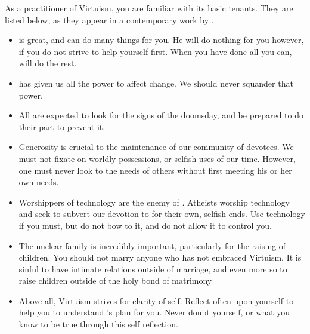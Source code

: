 \documentclass[blue]{guildcamp1}
\begin{document}
\name{\bVirtuism{}}

As a practitioner of Virtuism, you are familiar with its basic tenants. They are listed below, as they appear in a contemporary work by \cPastor{\MYname{}}.

\begin{itemize}
  \item \cGod{\MYname{}} is great, and can do many things for you. He will do nothing for you however, if you do not strive to help yourself first. When you have done all you can, \cGod{\MYname{}} will do the rest.
  
  \item \cGod{\MYname{}} has given us all the power to affect change. We should never squander that power. 
  
  \item All are expected to look for the signs of the doomsday, and be prepared to do their part to prevent it. 
  
  \item Generosity is crucial to the maintenance of our community of devotees. We must not fixate on worldly possessions, or selfish uses of our time. However, one must never look to the needs of others without first meeting his or her own needs.
  
  \item Worshippers of technology are the enemy of \cGod{\MYname{}}. Atheists worship technology and seek to subvert our devotion to \cGod{\MYname{}} for their own, selfish ends. Use technology if you must, but do not bow to it, and do not allow it to control you.
  
  \item The nuclear family is incredibly important, particularly for the raising of children. You should not marry anyone who has not embraced Virtuism. It is sinful to have intimate relations outside of marriage, and even more so to raise children outside of the holy bond of matrimony
  
  \item Above all, Virtuism strives for clarity of self. Reflect often upon yourself to help you to understand \cGod{\MYname{}}'s plan for you. Never doubt yourself, or what you know to be true through this self reflection.
\end{itemize}
\end{document}
